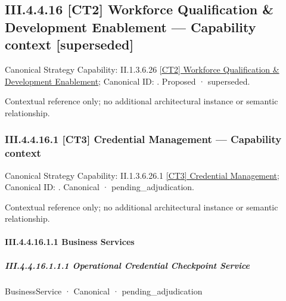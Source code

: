 \subsection*{III.4.4.16 [CT2] Workforce Qualification \& Development Enablement — Capability context [superseded]}
\label{navigation:III.4.4.16}

{\small Canonical Strategy Capability: II.1.3.6.26 \hyperref[element:d24a1f4c4f674c45a95c317998ff4186]{[CT2] Workforce Qualification \& Development Enablement}; Canonical ID: \texttt{}. Proposed · superseded.}\par
Contextual reference only; no additional architectural instance or semantic relationship.\par
\subsubsection*{III.4.4.16.1 [CT3] Credential Management — Capability context}
\label{navigation:III.4.4.16.1}

{\small Canonical Strategy Capability: II.1.3.6.26.1 \hyperref[element:3a7a4d2d0ce8446b8a6293284fb16b83]{[CT3] Credential Management}; Canonical ID: \texttt{}. Canonical · pending\_adjudication.}\par
Contextual reference only; no additional architectural instance or semantic relationship.\par
\paragraph*{III.4.4.16.1.1 Business Services}
\label{navigation:III.4.4.16.1.1}

\subparagraph*{III.4.4.16.1.1.1 Operational Credential Checkpoint Service}
\label{navigation:III.4.4.16.1.1.1}

\label{element:7ecc60e34e07491588b106b9075ab09a}
{\small BusinessService · Canonical · pending\_adjudication}\par

